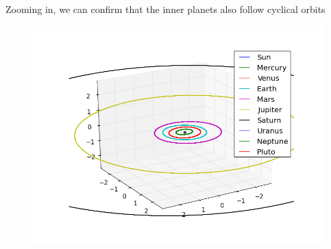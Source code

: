 \documentclass[10pt]{article}
\begin{document}
\begin{multicols}{2}
Zooming in, we can confirm that the inner planets also follow cyclical orbits


\begin{figure}[H]
    \centering
    \includegraphics[width=1.0\linewidth]{../results/full_system_inner.png}
    \label{fig:name}
\end{figure}






\end{multicols}
\end{document}
